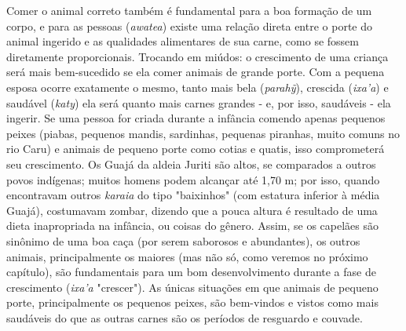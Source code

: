 Comer o animal correto também é fundamental para a boa formação de um
corpo, e para as pessoas (\emph{awatea}) existe uma relação direta entre
o porte do animal ingerido e as qualidades alimentares de sua carne,
como se fossem diretamente proporcionais. Trocando em miúdos: o
crescimento de uma criança será mais bem-sucedido se ela comer animais
de grande porte. Com a pequena esposa ocorre exatamente o mesmo, tanto
mais bela (\emph{parahỹ}), crescida (\emph{ixa'a}) e saudável
(\emph{katy}) ela será quanto mais carnes grandes - e, por isso,
saudáveis - ela ingerir. Se uma pessoa for criada durante a infância
comendo apenas pequenos peixes (piabas, pequenos mandis, sardinhas,
pequenas piranhas, muito comuns no rio Caru) e animais de pequeno porte
como cotias e quatis, isso comprometerá seu crescimento. Os Guajá da
aldeia Juriti são altos, se comparados a outros povos indígenas; muitos
homens podem alcançar até 1,70 m; por isso, quando encontravam outros
\emph{karaia} do tipo "baixinhos" (com estatura inferior à média Guajá),
costumavam zombar, dizendo que a pouca altura é resultado de uma dieta
inapropriada na infância, ou coisas do gênero. Assim, se os capelães são
sinônimo de uma boa caça (por serem saborosos e abundantes), os outros
animais, principalmente os maiores (mas não só, como veremos no próximo
capítulo), são fundamentais para um bom desenvolvimento durante a fase
de crescimento (\emph{ixa'a} "crescer"). As únicas situações em que
animais de pequeno porte, principalmente os pequenos peixes, são
bem-vindos e vistos como mais saudáveis do que as outras carnes são os
períodos de resguardo e couvade.

